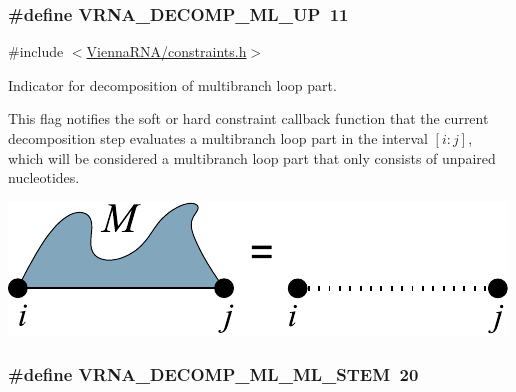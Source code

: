 \subsubsection[{\texorpdfstring{V\+R\+N\+A\+\_\+\+D\+E\+C\+O\+M\+P\+\_\+\+M\+L\+\_\+\+UP}{VRNA_DECOMP_ML_UP}}]{\setlength{\rightskip}{0pt plus 5cm}\#define V\+R\+N\+A\+\_\+\+D\+E\+C\+O\+M\+P\+\_\+\+M\+L\+\_\+\+UP~11}\hypertarget{group__constraints_gae6478dda14e50e2f2cb9ef333a29256e}{}\label{group__constraints_gae6478dda14e50e2f2cb9ef333a29256e}


{\ttfamily \#include $<$\hyperlink{constraints_8h}{Vienna\+R\+N\+A/constraints.\+h}$>$}



Indicator for decomposition of multibranch loop part. 

This flag notifies the soft or hard constraint callback function that the current decomposition step evaluates a multibranch loop part in the interval $[i:j]$, which will be considered a multibranch loop part that only consists of unpaired nucleotides.

 
\begin{DoxyImageNoCaption}
  \mbox{\includegraphics[width=\textwidth,height=\textheight/2,keepaspectratio=true]{decomp_ml_up}}
\end{DoxyImageNoCaption}
\subsubsection[{\texorpdfstring{V\+R\+N\+A\+\_\+\+D\+E\+C\+O\+M\+P\+\_\+\+M\+L\+\_\+\+M\+L\+\_\+\+S\+T\+EM}{VRNA_DECOMP_ML_ML_STEM}}]{\setlength{\rightskip}{0pt plus 5cm}\#define V\+R\+N\+A\+\_\+\+D\+E\+C\+O\+M\+P\+\_\+\+M\+L\+\_\+\+M\+L\+\_\+\+S\+T\+EM~20}\hypertarget{group__constraints_ga63d8ceb8c96ae3b463e529e28cc0fe98}{}\label{group__constraints_ga63d8ceb8c96ae3b463e529e28cc0fe98}


